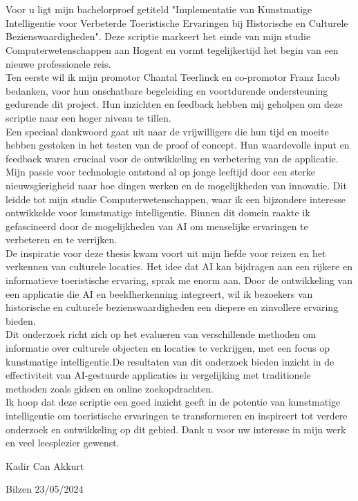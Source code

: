 


\chapter*{}%
\label{ch:voorwoord}

Voor u ligt mijn bachelorproef getiteld "Implementatie van Kunstmatige Intelligentie voor Verbeterde Toeristische Ervaringen bij Historische en Culturele Bezienswaardigheden". Deze scriptie markeert het einde van mijn studie Computerwetenschappen aan Hogent en vormt tegelijkertijd het begin van een nieuwe professionele reis.
\\
Ten eerste wil ik mijn promotor Chantal Teerlinck en co-promotor Franz Iacob bedanken, voor hun onschatbare begeleiding en voortdurende ondersteuning gedurende dit project. Hun inzichten en feedback hebben mij geholpen om deze scriptie naar een hoger niveau te tillen.
\\
Een speciaal dankwoord gaat uit naar de vrijwilligers die hun tijd en moeite hebben gestoken in het testen van de proof of concept. Hun waardevolle input en feedback waren cruciaal voor de ontwikkeling en verbetering van de applicatie.
\\
Mijn passie voor technologie ontstond al op jonge leeftijd door een sterke nieuwsgierigheid naar hoe dingen werken en de mogelijkheden van innovatie. Dit leidde tot mijn studie Computerwetenschappen, waar ik een bijzondere interesse ontwikkelde voor kunstmatige intelligentie. Binnen dit domein raakte ik gefascineerd door de mogelijkheden van AI om menselijke ervaringen te verbeteren en te verrijken.
\\
De inspiratie voor deze thesis kwam voort uit mijn liefde voor reizen en het verkennen van culturele locaties. Het idee dat AI kan bijdragen aan een rijkere en informatieve toeristische ervaring, sprak me enorm aan. Door de ontwikkeling van een applicatie die AI en beeldherkenning integreert, wil ik bezoekers van historische en culturele bezienswaardigheden een diepere en zinvollere ervaring bieden.
\\
Dit onderzoek richt zich op het evalueren van verschillende methoden om informatie over culturele objecten en locaties te verkrijgen, met een focus op kunstmatige intelligentie.De resultaten van dit onderzoek bieden inzicht in de effectiviteit van AI-gestuurde applicaties in vergelijking met traditionele methoden zoals gidsen en online zoekopdrachten.
\\
Ik hoop dat deze scriptie een goed inzicht geeft in de potentie van kunstmatige intelligentie om toeristische ervaringen te transformeren en inspireert tot verdere onderzoek en ontwikkeling op dit gebied.
\newline
Dank u voor uw interesse in mijn werk en veel leesplezier gewenst.
\newline


Kadir Can Akkurt

Bilzen 23/05/2024
\\